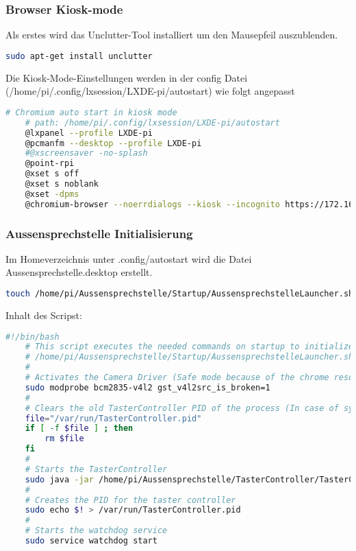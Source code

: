 \subsubsection{Browser Kiosk-mode}
Als erstes wird das Unclutter-Tool installiert um den Mausepfeil auszublenden.
\begin{lstlisting}[backgroundcolor = \color{snippetcolor},
language = bash,
xleftmargin = 1cm,
framexleftmargin = 0.1em,
breaklines=true]
	sudo apt-get install unclutter
\end{lstlisting}
Die Kiosk-Mode-Einstellungen werden in der config Datei  \\ (/home/pi/.config/lxsession/LXDE-pi/autostart) wie folgt angepasst
\begin{lstlisting}[backgroundcolor = \color{snippetcolor},
language = bash,
xleftmargin = 1cm,
framexleftmargin = 0.1em,
breaklines=true]
	# Chromium auto start in kiosk mode
	# path: /home/pi/.config/lxsession/LXDE-pi/autostart
	@lxpanel --profile LXDE-pi
	@pcmanfm --desktop --profile LXDE-pi
	#@xscreensaver -no-splash
	@point-rpi
	@xset s off
	@xset s noblank
	@xset -dpms
	@chromium-browser --noerrdialogs --kiosk --incognito https://172.16.111.99/server
\end{lstlisting}

\subsubsection{Aussensprechstelle Initialisierung}
Im Homeverzeichnis unter .config/autostart wird die Datei Aussensprechstelle.desktop erstellt.
\begin{lstlisting}[backgroundcolor = \color{snippetcolor},
language = bash,
xleftmargin = 1cm,
framexleftmargin = 0.1em,
breaklines=true]
	touch /home/pi/Aussensprechstelle/Startup/AussensprechstelleLauncher.sh
\end{lstlisting}
Inhalt des Scripst:
\begin{lstlisting}[backgroundcolor = \color{snippetcolor},
language = bash,
xleftmargin = 1cm,
framexleftmargin = 0.1em,
breaklines=true]
	#!/bin/bash
	# This script executes the needed commands on startup to initialize the Aussensprechstelle
	# /home/pi/Aussensprechstelle/Startup/AussensprechstelleLauncher.sh
	#
	# Activates the Camera Driver (Safe mode because of the chrome resolution bug)
	sudo modprobe bcm2835-v4l2 gst_v4l2src_is_broken=1
	#
	# Clears the old TasterController PID of the process (In case of system shutdown)
	file="/var/run/TasterController.pid"
	if [ -f $file ] ; then
		rm $file
	fi
	#
	# Starts the TasterController
	sudo java -jar /home/pi/Aussensprechstelle/TasterController/TasterController.jar &
	#
	# Creates the PID for the taster controller
	sudo echo $! > /var/run/TasterController.pid
	#
	# Starts the watchdog service
	sudo service watchdog start	
\end{lstlisting}

